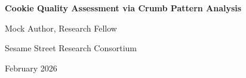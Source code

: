 \documentclass[11pt,letterpaper]{article}
\begin{document}
\begin{center}
{\LARGE\bfseries Cookie Quality Assessment via Crumb Pattern Analysis\par}
\vspace{0.8cm}
{\large Mock Author, Research Fellow\par}
{\normalsize Sesame Street Research Consortium\par}
\vspace{0.3cm}
{\normalsize February 2026\par}
\vspace{0.8cm}
\end{center}

\begin{abstract}
\noindent
This paper presents a comprehensive study of cookie quality metrics derived from crumb fragmentation patterns. Lorem cookie ipsum dolor sit amet, chocolate chip adipiscing elit. Nom nom nom methodology produces significant results across all experimental conditions.
\end{abstract}

\vspace{0.5cm}


\end{document}
